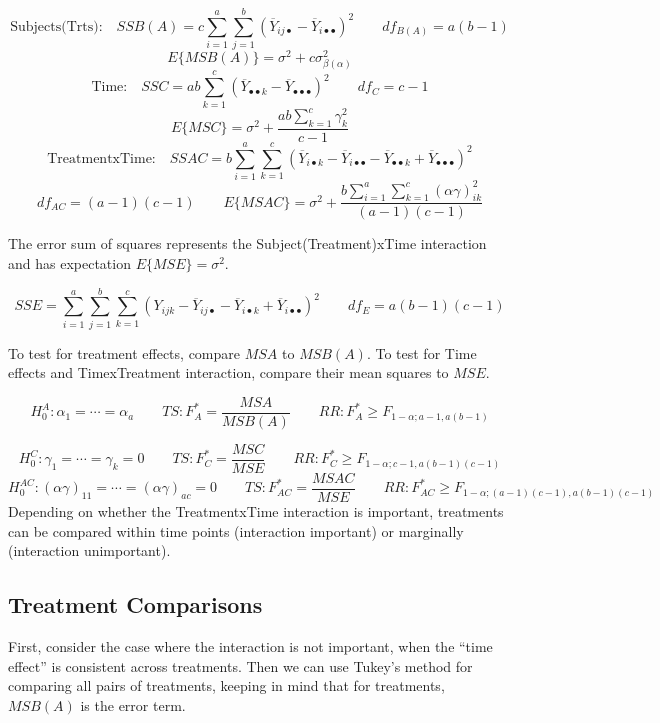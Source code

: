 \documentclass[
]{book}
\begin{document}
\[
\mbox{Subjects(Trts):} \quad
SSB(A) = c\sum_{i=1}^a\sum_{j=1}^b \left(
\overline{Y}_{ij\bullet}-\overline{Y}_{i\bullet\bullet}\right)^2
\qquad
df_{B(A)}=a(b-1)
\] \[
E\{MSB(A)\}=\sigma^2 + c\sigma_{\beta(\alpha)}^2 
\] \[
\mbox{Time:} \quad
SSC=ab\sum_{k=1}^c
\left(\overline{Y}_{\bullet\bullet k}-
\overline{Y}_{\bullet\bullet\bullet}\right)^2 \qquad  df_C=c-1
\] \[
E\{MSC\} = \sigma^2 + \frac{ab\sum_{k=1}^c\gamma_k^2}{c-1}
\] \[
\mbox{TreatmentxTime:} \quad SSAC=
b\sum_{i=1}^a\sum_{k=1}^c\left(
\overline{Y}_{i\bullet k}-
\overline{Y}_{i\bullet\bullet}-
\overline{Y}_{\bullet\bullet k}+
\overline{Y}_{\bullet\bullet\bullet}\right)^2
\] \[
df_{AC}=(a-1)(c-1)  \qquad
E\{MSAC\} =\sigma^2 + 
\frac{b\sum_{i=1}^a\sum_{k=1}^c(\alpha\gamma)_{ik}^2}{(a-1)(c-1)}
\]

The error sum of squares represents the Subject(Treatment)xTime
interaction and has expectation \(E\{MSE\}=\sigma^2\).

\[
SSE=\sum_{i=1}^a\sum_{j=1}^b\sum_{k=1}^c \left(
Y_{ijk}-\overline{Y}_{ij\bullet}-\overline{Y}_{i\bullet k}+
\overline{Y}_{i\bullet\bullet}
\right)^2 \qquad
df_E = a(b-1)(c-1)
\]

To test for treatment effects, compare \(MSA\) to \(MSB(A)\). To test
for Time effects and TimexTreatment interaction, compare their mean
squares to \(MSE\).

\[
H_0^A: \alpha_1=\cdots=\alpha_a 
\qquad
TS: F_A^*=\frac{MSA}{MSB(A)} \qquad
RR: F_A^*\geq F_{1-\alpha;a-1,a(b-1)}
\]

\[
H_0^C:\gamma_1=\cdots =\gamma_k=0
\qquad
TS:F_C^*=\frac{MSC}{MSE} \qquad
RR: F_C^* \geq F_{1-\alpha;c-1,a(b-1)(c-1)}
\] \[
H_0^{AC}:(\alpha\gamma)_{11}=\cdots =(\alpha\gamma)_{ac}=0
\qquad
TS:F_{AC}^*=\frac{MSAC}{MSE} \qquad
RR: F_{AC}^* \geq F_{1-\alpha;(a-1)(c-1),a(b-1)(c-1)}
\] Depending on whether the TreatmentxTime interaction is important,
treatments can be compared within time points (interaction important) or
marginally (interaction unimportant).

\subsection{Treatment Comparisons}\label{treatment-comparisons}

First, consider the case where the interaction is not important, when
the ``time effect'' is consistent across treatments. Then we can use
Tukey's method for comparing all pairs of treatments, keeping in mind
that for treatments, \(MSB(A)\) is the error term.
\end{document}
